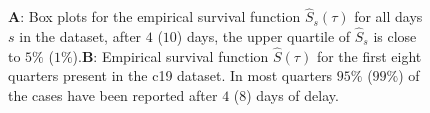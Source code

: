 \begin{figure}
   \resizebox{\textwidth}{!}{%
        
}
    \caption{\textbf{A}: Box plots for the empirical survival function $\hat S_{s}(\tau)$ for all days $s$ in the dataset, after $4$ ($10$) days, the upper quartile of $\hat S_{s}$ is close to $5\%$ ($1\%$).\textbf{B}: Empirical survival function $\hat S(\tau)$ for the first eight quarters present in the \gls{c19} dataset. In most quarters $95\%$ ($99\%$) of the cases have been reported after $4$ ($8$) days of delay.}
    \label{fig:survival_function_rep_tri_incidences}
\end{figure}
